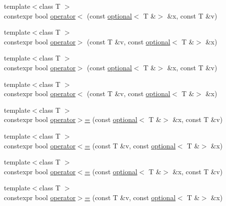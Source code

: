 \begin{DoxyCompactItemize}
{\footnotesize template$<$class T $>$ }\\constexpr bool \hyperlink{namespacestd_1_1experimental_a83a84dd901351c69fb0e53efe17526eb}{operator$<$} (const \hyperlink{classstd_1_1experimental_1_1optional}{optional}$<$ T \&$>$ \&x, const T \&v)
\item 
{\footnotesize template$<$class T $>$ }\\constexpr bool \hyperlink{namespacestd_1_1experimental_a84d294fc6ef231696e23f6b21f0391aa}{operator$>$} (const T \&v, const \hyperlink{classstd_1_1experimental_1_1optional}{optional}$<$ T \&$>$ \&x)
\item 
{\footnotesize template$<$class T $>$ }\\constexpr bool \hyperlink{namespacestd_1_1experimental_a733d2aa90d49bd113f2420f996e13a8f}{operator$>$} (const \hyperlink{classstd_1_1experimental_1_1optional}{optional}$<$ T \&$>$ \&x, const T \&v)
\item 
{\footnotesize template$<$class T $>$ }\\constexpr bool \hyperlink{namespacestd_1_1experimental_ae8fc20bba7e30d2ad7bc8646ec1de715}{operator$<$} (const T \&v, const \hyperlink{classstd_1_1experimental_1_1optional}{optional}$<$ T \&$>$ \&x)
\item 
{\footnotesize template$<$class T $>$ }\\constexpr bool \hyperlink{namespacestd_1_1experimental_a8e331f49161fae9a2dc83a0838d5c332}{operator$>$=} (const \hyperlink{classstd_1_1experimental_1_1optional}{optional}$<$ T \&$>$ \&x, const T \&v)
\item 
{\footnotesize template$<$class T $>$ }\\constexpr bool \hyperlink{namespacestd_1_1experimental_a59ad44110fa8b750e2ca4cf69327c182}{operator$<$=} (const T \&v, const \hyperlink{classstd_1_1experimental_1_1optional}{optional}$<$ T \&$>$ \&x)
\item 
{\footnotesize template$<$class T $>$ }\\constexpr bool \hyperlink{namespacestd_1_1experimental_adeee1539a6ebda9088aaaa92a363a38c}{operator$<$=} (const \hyperlink{classstd_1_1experimental_1_1optional}{optional}$<$ T \&$>$ \&x, const T \&v)
\item 
{\footnotesize template$<$class T $>$ }\\constexpr bool \hyperlink{namespacestd_1_1experimental_af08a779caea9116149f04d2b2e330b44}{operator$>$=} (const T \&v, const \hyperlink{classstd_1_1experimental_1_1optional}{optional}$<$ T \&$>$ \&x)
\item 

\end{DoxyCompactItemize}
